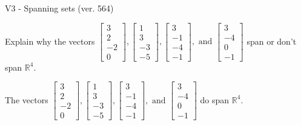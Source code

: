 \begin{exercise}
  \begin{exerciseTitle}V3 - Spanning sets (ver. 564)\end{exerciseTitle}
  \begin{exerciseStatement}
    Explain why the vectors \(\left[\begin{array}{r}
3 \\
2 \\
-2 \\
0
\end{array}\right] , \left[\begin{array}{r}
1 \\
3 \\
-3 \\
-5
\end{array}\right] , \left[\begin{array}{r}
3 \\
-1 \\
-4 \\
-1
\end{array}\right] , \text{ and } \left[\begin{array}{r}
3 \\
-4 \\
0 \\
-1
\end{array}\right]\) span or don't span \(\mathbb{R}^4\). 
	


  \end{exerciseStatement}
  \begin{exerciseAnswer}
   The vectors \(\left[\begin{array}{r}
3 \\
2 \\
-2 \\
0
\end{array}\right] , \left[\begin{array}{r}
1 \\
3 \\
-3 \\
-5
\end{array}\right] , \left[\begin{array}{r}
3 \\
-1 \\
-4 \\
-1
\end{array}\right] , \text{ and } \left[\begin{array}{r}
3 \\
-4 \\
0 \\
-1
\end{array}\right]\) 
  	 do  
	span \(\mathbb{R}^4\).
  


  \end{exerciseAnswer}
\end{exercise}